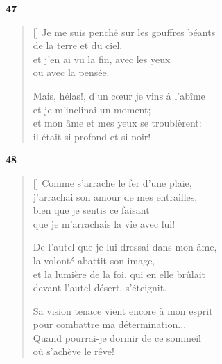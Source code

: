 \documentclass[a4paper,12pt]{book}
\begin{document}
\bigskip

\begin{center}
  \textbf{47}
\end{center}

\settowidth{\versewidth}{Je me suis penché sur les gouffres béants}

\begin{verse}[\versewidth]
  Je me suis penché sur les gouffres béants \\
  de la terre et du ciel, \\
  et j'en ai vu la fin, avec les yeux \\
  ou avec la pensée.

  Mais, hélas!, d'un cœur je vins à l'abîme \\
  et je m'inclinai un moment; \\
  et mon âme et mes yeux se troublèrent: \\
  il était si profond et si noir!
\end{verse}

\bigskip

\begin{center}
  \textbf{48}
\end{center}

\settowidth{\versewidth}{et la lumière de la foi, qui en elle brûlait}

\begin{verse}[\versewidth]
  Comme s'arrache le fer d'une plaie, \\
  j'arrachai son amour de mes entrailles, \\
  bien que je sentis ce faisant \\
  que je m'arrachais la vie avec lui!

  De l'autel que je lui dressai dans mon âme, \\
  la volonté abattit son image, \\
  et la lumière de la foi, qui en elle brûlait \\
  devant l'autel désert, s'éteignit.

  Sa vision tenace vient encore à mon esprit \\
  pour combattre ma détermination... \\
  Quand pourrai-je dormir de ce sommeil \\
  où s'achève le rêve!
\end{verse}
\end{document}
